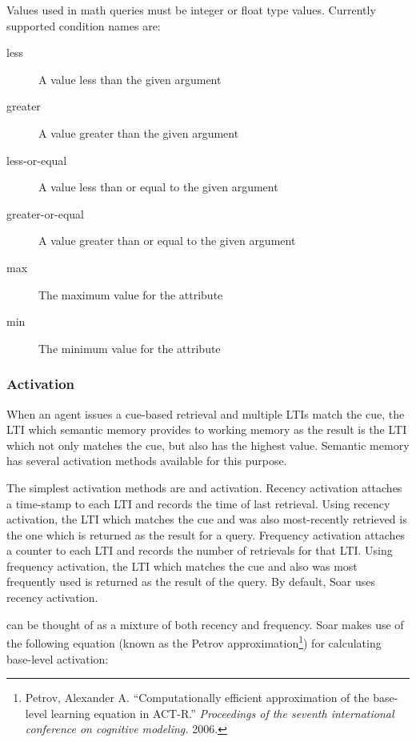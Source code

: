 \begin{itemize}
	Values used in math queries must be integer or float type values.
	Currently supported condition names are:
	
	\begin{description}
		\item[less] A value less than the given argument
		\item[greater] A value greater than the given argument
		\item[less-or-equal] A value less than or equal to the given argument
		\item[greater-or-equal] A value greater than or equal to the given argument
		\item[max] The maximum value for the attribute
		\item[min] The minimum value for the attribute
	\end{description}
	\vspace{-6pt}
\end{itemize}

\subsubsection{Activation}

When an agent issues a cue-based retrieval and multiple LTIs match the cue, the LTI which semantic memory provides to working memory as the result is the LTI which not only matches the cue, but also has the highest  value. Semantic memory has several activation methods available for this purpose.

The simplest activation methods are  and  activation. Recency activation attaches a time-stamp to each LTI and records the time of last retrieval. Using recency activation, the LTI which matches the cue and was also most-recently retrieved is the one which is returned as the result for a query. Frequency activation attaches a counter to each LTI and records the number of retrievals for that LTI. Using frequency activation, the LTI which matches the cue and also was most frequently used is returned as the result of the query. By default, Soar uses recency activation.

 can be thought of as a mixture of both recency and frequency. Soar makes use of the following equation (known as the Petrov approximation\footnote{Petrov, Alexander A. ``Computationally efficient approximation of the base-level learning equation in ACT-R.'' \textit{Proceedings of the seventh international conference on cognitive modeling.} 2006.}) for calculating base-level activation:


